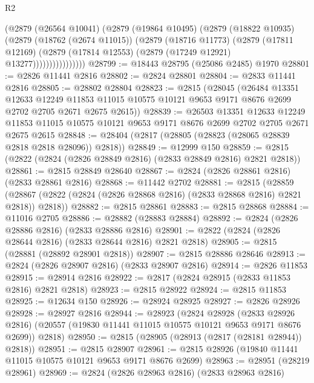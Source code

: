 \begin{lexlean}{R2}
\begin{coremodule}
                    (@2879
                      (@26564 @10041)
                      (@2879
                        (@19864 @10495)
                        (@2879
                          (@18822 @10935)
                          (@2879
                            (@18762 (@2674 @11015))
                            (@2879
                              (@18716 @11773)
                              (@2879
                                (@17811 @12169)
                                (@2879 (@17814 @12553) (@2879 (@17249 @12921) @13277))))))))))))))))
@28799 := @18443 @28795 (@25086 @2485) @1970
@28801 := @2826 @11441 @2816
@28802 := @2824 @28801
@28804 := @2833 @11441 @2816
@28805 := @28802 @28804
@28823 := @2815
    (@28045
      (@26484
        @13351
        @12633
        @12249
        @11853
        @11015
        @10575
        @10121
        @9653
        @9171
        @8676
        @2699
        @2702
        @2705
        @2671
        @2675
        @2615))
@28839 := @26503
    @13351
    @12633
    @12249
    @11853
    @11015
    @10575
    @10121
    @9653
    @9171
    @8676
    @2699
    @2702
    @2705
    @2671
    @2675
    @2615
@28848 := @28404 (@2817 (@28805 (@28823 (@28065 @28839 @2818 @2818 @28096)) @2818))
@28849 := @12999 @150
@28859 := @2815 (@2822 (@2824 (@2826 @28849 @2816) (@2833 @28849 @2816) @2821 @2818))
@28861 := @2815 @28849 @28640
@28867 := @2824 (@2826 @28861 @2816) (@2833 @28861 @2816)
@28868 := @11442 @2702
@28881 := @2815
    (@28859 (@28867 (@2822 (@2824 (@2826 @28868 @2816) (@2833 @28868 @2816) @2821 @2818)) @2818))
@28882 := @2815 @28861
@28883 := @2815 @28868
@28884 := @11016 @2705
@28886 := @28882 (@28883 @28884)
@28892 := @2824 (@2826 @28886 @2816) (@2833 @28886 @2816)
@28901 := @2822 (@2824 (@2826 @28644 @2816) (@2833 @28644 @2816) @2821 @2818)
@28905 := @2815 (@28881 (@28892 @28901 @2818))
@28907 := @2815 @28886 @28646
@28913 := @2824 (@2826 @28907 @2816) (@2833 @28907 @2816)
@28914 := @2826 @11853
@28915 := @28914 @2816
@28922 := @2817 (@2824 @28915 (@2833 @11853 @2816) @2821 @2818)
@28923 := @2815 @28922
@28924 := @2815 @11853
@28925 := @12634 @150
@28926 := @28924 @28925
@28927 := @2826 @28926
@28928 := @28927 @2816
@28944 := @28923
    (@2824
      @28928
      (@2833 @28926 @2816)
      (@20557 (@19830 @11441 @11015 @10575 @10121 @9653 @9171 @8676 @2699))
      @2818)
@28950 := @2815 (@28905 (@28913 (@2817 (@28181 @28944)) @2818))
@28951 := @2815 @28907
@28961 := @2815 @28926 (@19840 @11441 @11015 @10575 @10121 @9653 @9171 @8676 @2699)
@28963 := @28951 (@28219 @28961)
@28969 := @2824 (@2826 @28963 @2816) (@2833 @28963 @2816)

\end{coremodule}
\end{lexlean}
